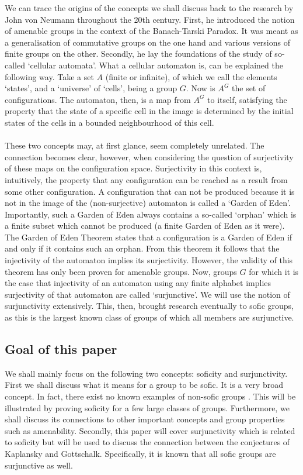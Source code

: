\documentclass[titlepage, a4paper]{article}
\theoremstyle{remark}
\begin{document}
We can trace the origins of the concepts we shall discuss back to the research by John von Neumann throughout the 20th century. First, he introduced the notion of amenable groups in the context of the Banach-Tarski Paradox. It was meant as a generalisation of commutative groups on the one hand and various versions of finite groups on the other. Secondly, he lay the foundations of the study of so-called ‘cellular automata’. What a cellular automaton is, can be explained the following way. Take a set $A$ (finite or infinite), of which we call the elements ‘states’, and a ‘universe’ of ‘cells’, being a group $G$. Now is $A^G$ the set of configurations. The automaton, then, is a map from $A^G$ to itself, satisfying the property that the state of a specific cell in the image is determined by the initial states of the cells in a bounded neighbourhood of this cell.\\
\\
These two concepts may, at first glance, seem completely unrelated. The connection becomes clear, however, when considering the question of surjectivity of these maps on the configuration space. Surjectivity in this context is, intuitively, the property that any configuration can be reached as a result from some other configuration. A configuration that can not be produced because it is not in the image of the (non-surjective) automaton is called a ‘Garden of Eden’. Importantly, such a Garden of Eden always contains a so-called ‘orphan’ which is a finite subset which cannot be produced (a finite Garden of Eden as it were). The Garden of Eden Theorem states that a configuration is a Garden of Eden if and only if it contains such an orphan. From this theorem it follows that the injectivity of the automaton implies its surjectivity. However, the validity of this theorem has only been proven for amenable groups.
Now, groups $G$ for which it is the case that injectivity of an automaton using any finite alphabet implies surjectivity of that automaton are called ‘surjunctive’. We will use the notion of surjunctivity extensively. This, then, brought research eventually to sofic groups, as this is the largest known class of groups of which all members are surjunctive.  

\subsection*{Goal of this paper}

We shall mainly focus on the following two concepts: soficity and surjunctivity. First we shall discuss what it means for a group to be sofic. It is a very broad concept. In fact, there exist no known examples of non-sofic groups \cite{weiss_2000}. This will be illustrated by proving soficity for a few large classes of groups. Furthermore, we shall discuss its connections to other important concepts and group properties such as amenability. Secondly, this paper will cover surjunctivity which is related to soficity but will be used to discuss the connection between the conjectures of Kaplansky and Gottschalk. Specifically, it is known that all sofic groups are surjunctive as well.
\end{document}
